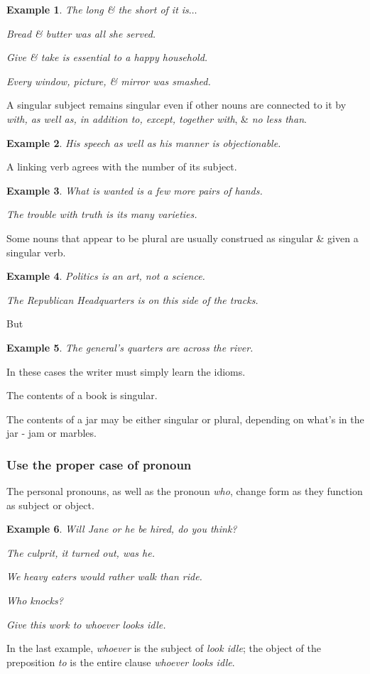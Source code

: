 \documentclass{article}
\newtheorem{example}{Example}
\begin{document}
\begin{example}
	The long \& the short of it is$\ldots$
	
	Bread \& butter was all she served.
	
	Give \& take is essential to a happy household.
	
	Every window, picture, \& mirror was smashed.
\end{example}
A singular subject remains singular even if other nouns are connected to it by {\it with, as well as, in addition to, except, together with}, \& {\it no less than}.
\begin{example}
	His speech as well as his manner is objectionable.
\end{example}
A linking verb agrees with the number of its subject.
\begin{example}
	What is wanted is a few more pairs of hands.
	
	The trouble with truth is its many varieties.
\end{example}
Some nouns that appear to be plural are usually construed as singular \& given a singular verb.
\begin{example}
	Politics is an art, not a science.
	
	The Republican Headquarters is on this side of the tracks.
\end{example}
But
\begin{example}
	The general's quarters are across the river.
\end{example}
In these cases the writer must simply learn the idioms.

The contents of a book is singular.

The contents of a jar may be either singular or plural, depending on what's in the jar - jam or marbles.


\subsubsection{Use the proper case of pronoun}
The personal pronouns, as well as the pronoun {\it who}, change form as they function as subject or object.
\begin{example}
	Will Jane or he be hired, do you think?
	
	The culprit, it turned out, was he.
	
	We heavy eaters would rather walk than ride.
	
	Who knocks?
	
	Give this work to whoever looks idle.
\end{example}
In the last example, {\it whoever} is the subject of {\it look idle}; the object of the preposition {\it to} is the entire clause {\it whoever looks idle}.
\end{document}
